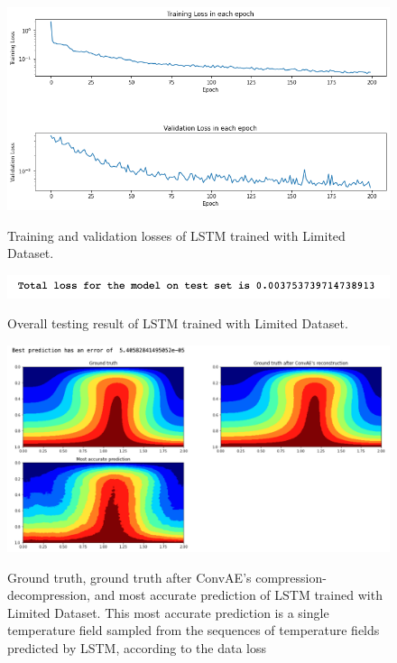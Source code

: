 \begin{figure}[H]
    \caption{Training and validation losses of LSTM trained with Limited Dataset.}
    \includegraphics[scale=0.6]{figures/mantle_convection_images/limited_dataset/LSTM_trainingData.png}
    \label{figure:LSTM_limited_losses}
\end{figure}

\begin{figure}[H]
    \caption{Overall testing result of LSTM trained with Limited Dataset.}
    \includegraphics[scale=0.8]{figures/mantle_convection_images/limited_dataset/LSTM_OverallTesting.png}
    \label{figure:LSTM_limited_testing}
\end{figure}

\begin{figure}[H]
    \caption{Ground truth, ground truth after ConvAE's compression-decompression, and most accurate prediction of LSTM trained with Limited Dataset. This most accurate prediction is a single temperature field sampled from the sequences of temperature fields predicted by LSTM, according to the data loss}
    \includegraphics[scale=0.5]{figures/mantle_convection_images/limited_dataset/LSTM_Best.png}
    \label{figure:LSTM_limited_best}
\end{figure}

